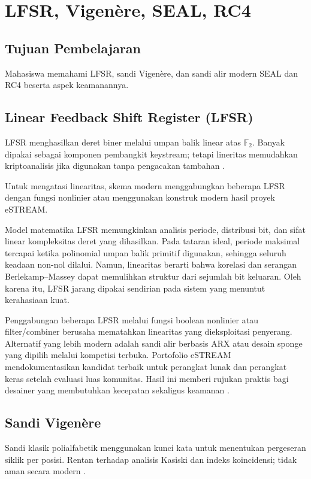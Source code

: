 \documentclass[../main.tex]{subfiles}
\begin{document}
\chapter{LFSR, Vigen\`{e}re, SEAL, RC4}

\section{Tujuan Pembelajaran}
Mahasiswa memahami LFSR, sandi Vigen\`{e}re, dan sandi alir modern SEAL dan RC4 beserta aspek keamanannya.

\section{Linear Feedback Shift Register (LFSR)}
LFSR menghasilkan deret biner melalui umpan balik linear atas \(\mathbb{F}_2\). Banyak dipakai sebagai komponen pembangkit keystream; tetapi lineritas memudahkan kriptoanalisis jika digunakan tanpa pengacakan tambahan \citep{menezes}.

Untuk mengatasi linearitas, skema modern menggabungkan beberapa LFSR dengan fungsi nonlinier atau menggunakan konstruk modern hasil proyek eSTREAM.

Model matematika LFSR memungkinkan analisis periode, distribusi bit, dan sifat linear kompleksitas deret yang dihasilkan. Pada tataran ideal, periode maksimal tercapai ketika polinomial umpan balik primitif digunakan, sehingga seluruh keadaan non-nol dilalui. Namun, linearitas berarti bahwa korelasi dan serangan Berlekamp–Massey dapat memulihkan struktur dari sejumlah bit keluaran. Oleh karena itu, LFSR jarang dipakai sendirian pada sistem yang menuntut kerahasiaan kuat.

Penggabungan beberapa LFSR melalui fungsi boolean nonlinier atau filter/combiner berusaha mematahkan linearitas yang dieksploitasi penyerang. Alternatif yang lebih modern adalah sandi alir berbasis ARX atau desain sponge yang dipilih melalui kompetisi terbuka. Portofolio eSTREAM mendokumentasikan kandidat terbaik untuk perangkat lunak dan perangkat keras setelah evaluasi luas komunitas. Hasil ini memberi rujukan praktis bagi desainer yang membutuhkan kecepatan sekaligus keamanan \citep{estream}.

\section{Sandi Vigen\`{e}re}
Sandi klasik polialfabetik menggunakan kunci kata untuk menentukan pergeseran siklik per posisi. Rentan terhadap analisis Kasiski dan indeks koincidensi; tidak aman secara modern \citep{stallings}.
\end{document}
